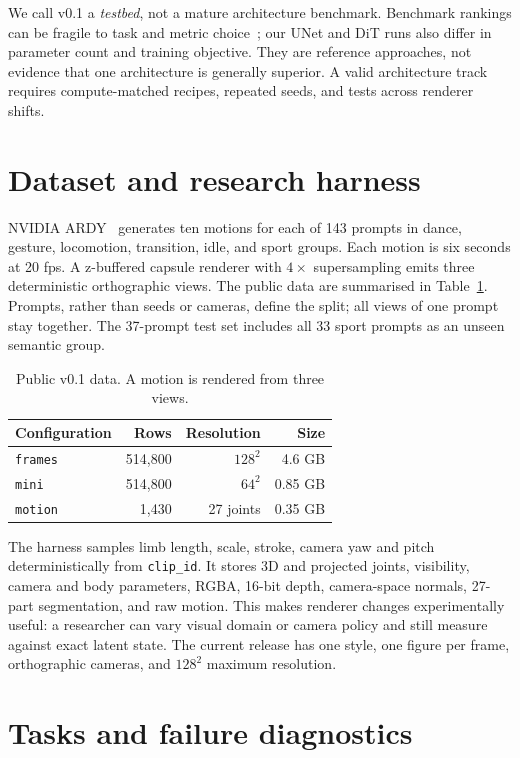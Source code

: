 \documentclass[10pt,twocolumn]{article}
\begin{document}
We call v0.1 a \emph{testbed}, not a mature architecture benchmark. Benchmark rankings can be fragile to task and
metric choice~\cite{dehghani2021lottery}; our UNet and DiT runs also differ in parameter count and training objective.
They are reference approaches, not evidence that one architecture is generally superior. A valid architecture track
requires compute-matched recipes, repeated seeds, and tests across renderer shifts.

\section{Dataset and research harness}
NVIDIA ARDY~\cite{zhao2026ardy} generates ten motions for each of 143 prompts in dance, gesture, locomotion,
transition, idle, and sport groups. Each motion is six seconds at 20 fps. A z-buffered capsule renderer with
$4\times$ supersampling emits three deterministic orthographic views. The public data are summarised in
Table~\ref{tab:data}. Prompts, rather than seeds or cameras, define the split; all views of one prompt stay together.
The 37-prompt test set includes all 33 sport prompts as an unseen semantic group.

\begin{table}[t]\centering\caption{Public v0.1 data. A motion is rendered from three views.}\label{tab:data}\small
\begin{tabular}{@{}lrrr@{}}\toprule Configuration & Rows & Resolution & Size \\\midrule
\texttt{frames} & 514,800 & $128^2$ & 4.6 GB \\
\texttt{mini} & 514,800 & $64^2$ & 0.85 GB \\
\texttt{motion} & 1,430 & 27 joints & 0.35 GB \\\bottomrule\end{tabular}\end{table}

The harness samples limb length, scale, stroke, camera yaw and pitch deterministically from \texttt{clip\_id}. It
stores 3D and projected joints, visibility, camera and body parameters, RGBA, 16-bit depth, camera-space normals,
27-part segmentation, and raw motion. This makes renderer changes experimentally useful: a researcher can vary visual
domain or camera policy and still measure against exact latent state. The current release has one style, one figure per
frame, orthographic cameras, and $128^2$ maximum resolution.

\section{Tasks and failure diagnostics}
\end{document}
